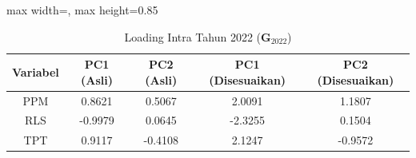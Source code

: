\begin{table}[H]
\centering
\caption{Loading Intra Tahun 2022 ($\mathbf{G}_{2022}$)} \label{tab:sample1loading_intra_2022}
\begin{adjustbox}{max width=\textwidth, max height=0.85\textheight}
\begin{tabular}{|c|c|c|c|c|}
\hline
\textbf{Variabel} & \textbf{PC1 (Asli)} & \textbf{PC2 (Asli)} & \textbf{PC1 (Disesuaikan)} & \textbf{PC2 (Disesuaikan)} \\
\hline
PPM & 0.8621 & 0.5067 & 2.0091 & 1.1807 \\
RLS & -0.9979 & 0.0645 & -2.3255 & 0.1504 \\
TPT & 0.9117 & -0.4108 & 2.1247 & -0.9572 \\
\hline
\end{tabular}
\end{adjustbox}
\end{table}